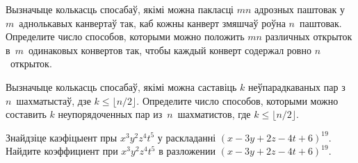 \begin{problemList}
\bigskip

\problemItemSimple
{Вызначыце колькасць спосабаў, якімі можна пакласці $mn$ адрозных
паштовак у~$m$~аднолькавых канвертаў так, каб кожны канверт змяшчаў
роўна $n$~паштовак.}
{Определите число способов, которыми можно положить $mn$ различных
открыток в~$m$~одинаковых конвертов так, чтобы каждый конверт содержал
ровно $n$~открыток.}

\bigskip

\problemItemSimple
{Вызначыце колькасць спосабаў, якімі можна саставіць $k$ неўпарадкаваных
пар з~$n$~шахматыстаў, дзе $k \le \lfloor n/2\rfloor$.}
{Определите число способов, которыми можно составить $k$ неупорядоченных
пар из~$n$~шахматистов, где $k \le \lfloor n/2\rfloor$.}

\bigskip

\problemItemSimple
{Знайдзіце каэфіцыент пры $x^3y^2z^4t^5$ у раскладанні $(x - 3y + 2z - 4t + 6)^{19}$.}
{Найдите коэффициент при $x^3y^2z^4t^5$ в разложении $(x - 3y + 2z - 4t + 6)^{19}$.}

\end{problemList}


